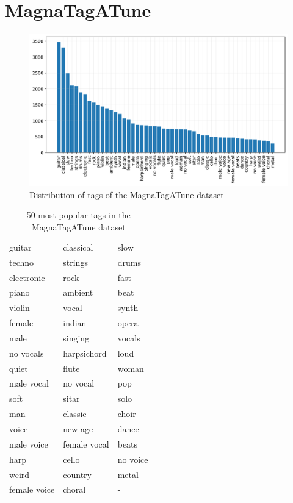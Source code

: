 \section{MagnaTagATune}

\begin{figure}[t]
    \centering
    \includegraphics[width=\columnwidth]{figs/tag_stats_magnatagatune.png}
    \caption{Distribution of tags of the MagnaTagATune dataset}
    \label{fig:tag_stats_magnatagatune}
\end{figure}


\begin{table}[t]
    \centering
    \begin{tabular}{lll}\toprule
        guitar  & classical & slow \\
        techno & strings & drums \\
        electronic & rock & fast \\
        piano & ambient & beat \\
        violin & vocal & synth \\
        female & indian & opera \\
        male & singing & vocals \\
        no vocals & harpsichord & loud \\
        quiet & flute & woman \\
        male vocal & no vocal & pop \\
        soft & sitar & solo \\
        man & classic & choir \\
        voice & new age & dance \\
        male voice & female vocal & beats \\
        harp & cello & no voice \\
        weird & country & metal \\
        female voice & choral & - \\                 
        \bottomrule
    \end{tabular}
    \caption{50 most popular tags in the MagnaTagATune dataset}
    \label{tab:magnatagatune_tags}
\end{table}





